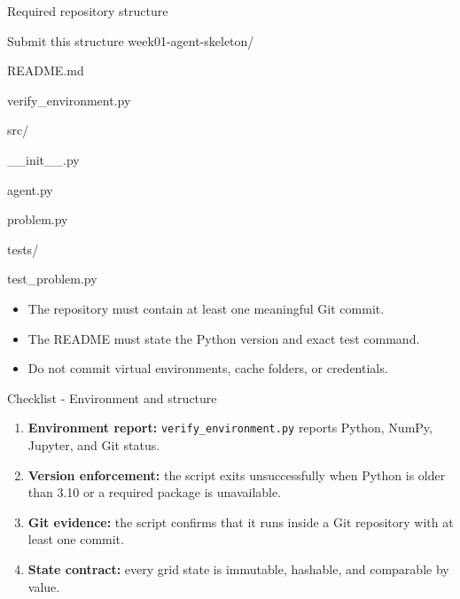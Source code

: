 \documentclass[aspectratio=169,11pt]{beamer}
\begin{document}
\begin{frame}{Required repository structure}
  \begin{block}{Submit this structure}
    \ttfamily
    week01-agent-skeleton/\par
    \hspace{0.45cm}README.md\par
    \hspace{0.45cm}verify\_environment.py\par
    \hspace{0.45cm}src/\par
    \hspace{0.9cm}\_\_init\_\_.py\par
    \hspace{0.9cm}agent.py\par
    \hspace{0.9cm}problem.py\par
    \hspace{0.45cm}tests/\par
    \hspace{0.9cm}test\_problem.py
  \end{block}
  \vspace{0.25cm}
  \begin{itemize}
    \item The repository must contain at least one meaningful Git commit.
    \item The README must state the Python version and exact test command.
    \item Do not commit virtual environments, cache folders, or credentials.
  \end{itemize}
\end{frame}

\begin{frame}{Checklist - Environment and structure}
  \begin{enumerate}
    \item \textbf{Environment report:} \texttt{verify\_environment.py} reports
      Python, NumPy, Jupyter, and Git status.
    \item \textbf{Version enforcement:} the script exits unsuccessfully when
      Python is older than 3.10 or a required package is unavailable.
    \item \textbf{Git evidence:} the script confirms that it runs inside a Git
      repository with at least one commit.
    \item \textbf{State contract:} every grid state is immutable, hashable, and
      comparable by value.
  \end{enumerate}
\end{frame}
\end{document}
